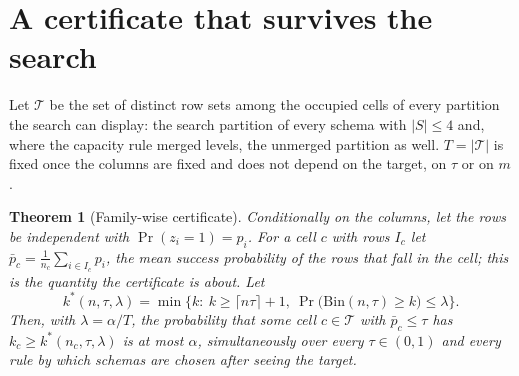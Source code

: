 \documentclass[11pt]{article}
\newtheorem{theorem}{Theorem}
\begin{document}
\section{A certificate that survives the search}\label{sec:certificate}

Let $\mathcal{T}$ be the set of distinct row sets among the occupied cells of every partition the search can display: the search partition of every schema with $|S|\le 4$ and, where the capacity rule merged levels, the unmerged partition as well. $T=|\mathcal{T}|$ is fixed once the columns are fixed and does not depend on the target, on $\tau$ or on $m$.

\begin{theorem}[Family-wise certificate]\label{thm:cert}
Conditionally on the columns, let the rows be independent with $\Pr(z_i=1)=p_i$. For a cell $c$ with rows $I_c$ let $\bar p_c=\frac1{n_c}\sum_{i\in I_c}p_i$, the mean success probability of the rows that fall in the cell; this is the quantity the certificate is about. Let
\[
k^*(n,\tau,\lambda)=\min\Big\{k:\ k\ge\lceil n\tau\rceil+1,\ \Pr\big(\mathrm{Bin}(n,\tau)\ge k\big)\le\lambda\Big\}.
\]
Then, with $\lambda=\alpha/T$, the probability that some cell $c\in\mathcal{T}$ with $\bar p_c\le\tau$ has $k_c\ge k^*(n_c,\tau,\lambda)$ is at most $\alpha$, simultaneously over every $\tau\in(0,1)$ and every rule by which schemas are chosen after seeing the target.
\end{theorem}
\end{document}
